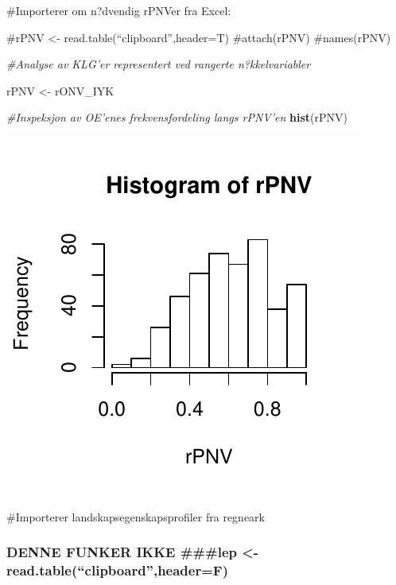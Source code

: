 \documentclass[]{article}
\newenvironment{Shaded}{\begin{snugshade}}{\end{snugshade}}
\newcommand{\CommentTok}[1]{\textcolor[rgb]{0.56,0.35,0.01}{\textit{#1}}}
\newcommand{\KeywordTok}[1]{\textcolor[rgb]{0.13,0.29,0.53}{\textbf{#1}}}
\newcommand{\NormalTok}[1]{#1}
\newcommand{\StringTok}[1]{\textcolor[rgb]{0.31,0.60,0.02}{#1}}
\begin{document}
\#Importerer om n?dvendig rPNVer fra Excel:

\#rPNV \textless{}- read.table(``clipboard'',header=T) \#attach(rPNV)
\#names(rPNV)

\begin{Shaded}
\begin{Highlighting}[]
\CommentTok{#Analyse av KLG'er representert ved rangerte n?kkelvariabler}

\NormalTok{rPNV <-}\StringTok{ }\NormalTok{rONV_IYK}
\end{Highlighting}
\end{Shaded}

\begin{Shaded}
\begin{Highlighting}[]
\CommentTok{#Inspeksjon av OE'enes frekvensfordeling langs rPNV'en}
\KeywordTok{hist}\NormalTok{(rPNV)}
\end{Highlighting}
\end{Shaded}

\includegraphics{Landscape_analysis_example_4_files/figure-latex/unnamed-chunk-32-1.pdf}

\#Importerer landskapsegenskapsprofiler fra regneark

\hypertarget{denne-funker-ikke-lep---read.tableclipboardheaderf}{%
\subsubsection{DENNE FUNKER IKKE \#\#\#lep \textless{}-
read.table(``clipboard'',header=F)}\label{denne-funker-ikke-lep---read.tableclipboardheaderf}}
\end{document}
